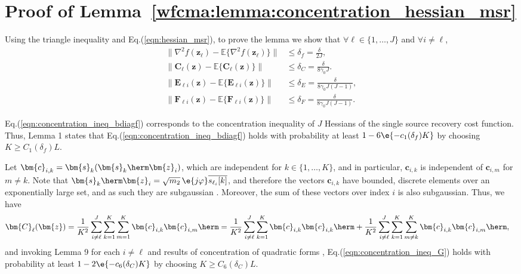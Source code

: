 \section{Proof of Lemma~\ref{wfcma:lemma:concentration_hessian_msr} }\label{wfcma:appdx:concentration_hessian_msr}

Using the triangle inequality and Eq.(\ref{eqn:hessian_msr}), to prove the lemma we show that $\forall {\ell}\in\{1,\ldots,J\}$ and $\forall i\neq {\ell}$,
\begin{align}
\Big\|\nabla^2 f(\bm{z}_{\ell})-\mathbb{E}\big\{\nabla^2 f(\bm{z}_{\ell})\big\}\Big\|&\leq \delta_f=\frac{\delta}{2J}, \label{eqn:concentration_ineq_bdiagf}\\
\|\bm{C}_{\ell}(\bm{z})-\mathbb{E}\{\bm{C}_{\ell}(\bm{z})\}\|&\leq 
\delta_C=\frac{\delta}{8\gamma_0J}. \label{eqn:concentration_ineq_G}\\
\|\bm{E}_{{\ell}i}(\bm{z})-\mathbb{E}\{\bm{E}_{{\ell}i}(\bm{z})\}\|&\leq \delta_E =
\frac{\delta}{8\gamma_0J(J-1)}, \label{eqn:concentration_ineq_E}\\
\|\bm{F}_{{\ell}i}(\bm{z})-\mathbb{E}\{\bm{F}_{{\ell}i}(\bm{z})\}\|&\leq \delta_F =
\frac{\delta}{8\gamma_0J(J-1)}. \label{eqn:concentration_ineq_F}
\end{align}

Eq.(\ref{eqn:concentration_ineq_bdiagf}) corresponds to the concentration inequality of $J$ Hessians of the single source recovery cost function. Thus, Lemma 1 states that Eq.(\ref{eqn:concentration_ineq_bdiagf}) holds with probability at least $1-6\e{-c_1(\delta_f)K}$ by choosing $K\geq C_1(\delta_f)L$.

Let $\bm{c}_{i,k}= \bm{s}_k(\bm{s}_k\herm\bm{z}_i)$, which are independent for $k\in\{1,\ldots,K\}$, and in particular, $\bm{c}_{i,k}$ is independent of $\bm{c}_{i,m}$ for $m\neq k$. Note that $\bm{s}_k\herm\bm{z}_i=\sqrt{m_2}\,\e{j\varphi}\overline{s_{\ell_i}[k]}$, and therefore the vectors $\bm{c}_{i,k}$ have bounded, discrete elements over an exponentially large set, and as such they are subgaussian \cite{Vershynin2018hdprobability}. Moreover, the sum of these vectors over index $i$ is also subgaussian. Thus, we have
\begin{align}
\bm{C}_{{\ell}}(\bm{z}) &= \frac{1}{K^2}\sum_{i\neq {\ell}}^J\sum_{k=1}^K\sum_{m=1}^K\bm{c}_{i,k}\bm{c}_{i,m}\herm= \frac{1}{K^2}\sum_{i\neq {\ell}}^J\sum_{k=1}^K\bm{c}_{i,k}\bm{c}_{i,k}\herm+ \frac{1}{K^2}\sum_{i\neq {\ell}}^J\sum_{k=1}^K\sum_{m\neq k}^K\bm{c}_{i,k}\bm{c}_{i,m}\herm,
\end{align}
and invoking Lemma 9 for each $i\neq {\ell}$ and results of concentration of quadratic forms \cite[Chapter 6]{Vershynin2018hdprobability}, Eq.(\ref{eqn:concentration_ineq_G}) holds with probability at least $1-2\e{-c_6(\delta_C)K}$ by choosing $K\geq C_6(\delta_C)L$.


